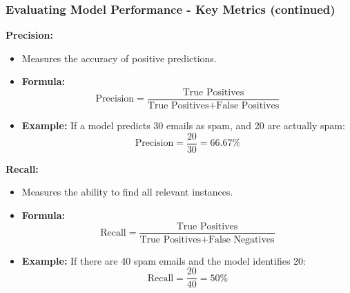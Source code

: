 \documentclass[aspectratio=169]{beamer}
\begin{document}
\begin{frame}[fragile]
    \frametitle{Evaluating Model Performance - Key Metrics (continued)}
    \textbf{Precision:}
    \begin{itemize}
        \item Measures the accuracy of positive predictions.
        \item \textbf{Formula:}
        \begin{equation}
        \text{Precision} = \frac{\text{True Positives}}{\text{True Positives} + \text{False Positives}}
        \end{equation}
        \item \textbf{Example:} If a model predicts 30 emails as spam, and 20 are actually spam:
        \begin{equation}
        \text{Precision} = \frac{20}{30} = 66.67\%
        \end{equation}
    \end{itemize}

    \textbf{Recall:}
    \begin{itemize}
        \item Measures the ability to find all relevant instances.
        \item \textbf{Formula:}
        \begin{equation}
        \text{Recall} = \frac{\text{True Positives}}{\text{True Positives} + \text{False Negatives}}
        \end{equation}
        \item \textbf{Example:} If there are 40 spam emails and the model identifies 20:
        \begin{equation}
        \text{Recall} = \frac{20}{40} = 50\%
        \end{equation}
    \end{itemize}
\end{frame}
\end{document}
